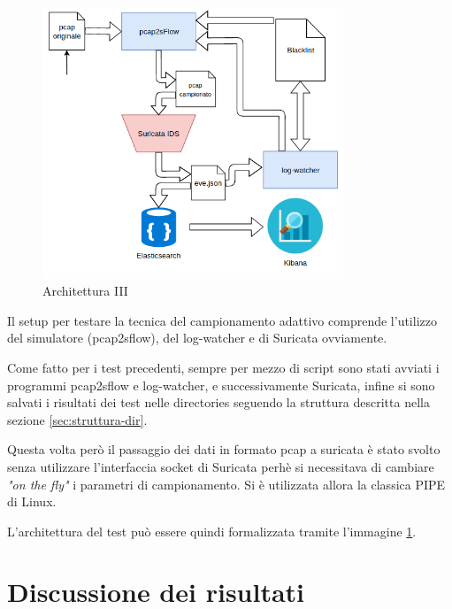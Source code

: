 \documentclass[12pt,a4paper,openright,twoside]{report}
\begin{document}
\begin{figure}[t]
\begin{center}                          %
  \includegraphics[width=90mm]{images/arch-3.png}
  \caption{Architettura III}
  \label{img:arch3}
\end{center}
\end{figure}

Il setup per testare la tecnica del campionamento adattivo comprende l'utilizzo
del simulatore (pcap2sflow), del log-watcher e di Suricata ovviamente.

Come fatto per i test precedenti, sempre per mezzo di script sono stati avviati i
programmi pcap2sflow e log-watcher, e successivamente Suricata, infine si sono salvati
i risultati dei test nelle directories seguendo la struttura descritta nella sezione \ref{sec:struttura-dir}.

Questa volta per\`o il passaggio dei dati in formato pcap a suricata \`e stato
svolto senza utilizzare l'interfaccia socket di Suricata perh\`e si necessitava di
cambiare {\it "on the fly"} i parametri di campionamento. Si \`e utilizzata allora
la classica PIPE di Linux.

L'architettura del test pu\`o essere quindi formalizzata tramite l'immagine \ref{img:arch3}.




\chapter{Discussione dei risultati}                %
\lhead[\fancyplain{}{\bfseries\thepage}]{\fancyplain{}{\bfseries\rightmark}}
\end{document}
